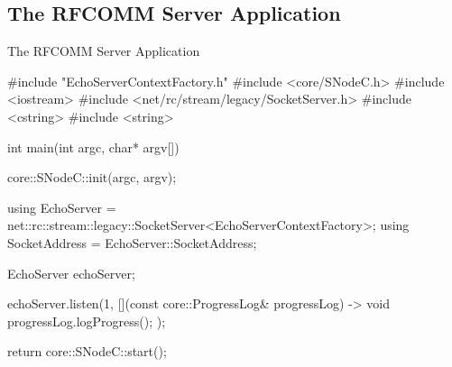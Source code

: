 ﻿\subsection{The RFCOMM Server Application}

\begin{frame}[fragile]{The RFCOMM Server Application}
  \begin{cppcode}[autogobble=true, caption={RFCOMM server application.},captionpos=b]
    #include "EchoServerContextFactory.h"
    #include <core/SNodeC.h>
    #include <iostream>
    #include <net/rc/stream/legacy/SocketServer.h>
    #include <cstring>
    #include <string>

    int main(int argc, char* argv[]) {
      core::SNodeC::init(argc, argv);

      using EchoServer = net::rc::stream::legacy::SocketServer<EchoServerContextFactory>;
      using SocketAddress = EchoServer::SocketAddress;

      EchoServer echoServer;

      echoServer.listen(1, [](const core::ProgressLog& progressLog) -> void {
        progressLog.logProgress();
      });

      return core::SNodeC::start();
    }
  \end{cppcode}
\end{frame}
